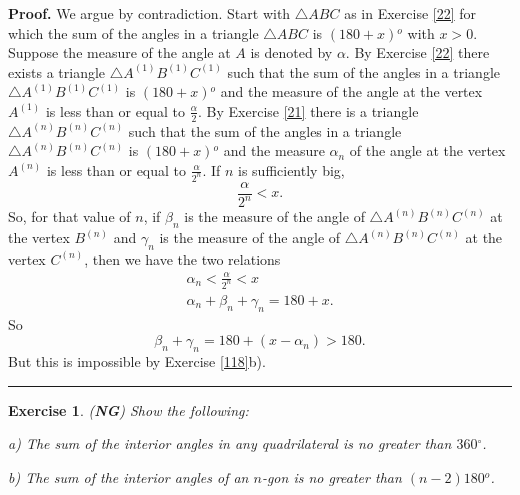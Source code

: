 \documentclass{article}%
\providecommand{\U}[1]{\protect\rule{.1in}{.1in}}
\newtheorem{exercise}[theorem]{Exercise}
\newenvironment{proof}[1][Proof]{\noindent\textbf{#1.} }{\ \rule{0.5em}{0.5em}}
\begin{document}
\begin{proof}
We argue by contradiction. Start with $\triangle ABC$ as in Exercise \ref{22}
for which the sum of the angles in a triangle $\triangle ABC$ is $\left(
180+x\right)
{{}^o}%
$ with $x>0$. Suppose the measure of the angle at $A$ is denoted by $\alpha$.
By Exercise \ref{22} there exists a triangle $\triangle A^{\left(  1\right)
}B^{\left(  1\right)  }C^{\left(  1\right)  }$ such that the sum of the angles
in a triangle $\triangle A^{\left(  1\right)  }B^{\left(  1\right)
}C^{\left(  1\right)  }$ is $\left(  180+x\right)
{{}^o}%
$ and the measure of the angle at the vertex $A^{\left(  1\right)  }$ is less
than or equal to $\frac{\alpha}{2}$. By Exercise \ref{21} there is a triangle
$\triangle A^{\left(  n\right)  }B^{\left(  n\right)  }C^{\left(  n\right)  }$
such that the sum of the angles in a triangle $\triangle A^{\left(  n\right)
}B^{\left(  n\right)  }C^{\left(  n\right)  }$ is $\left(  180+x\right)
{{}^o}%
$ and the measure $\alpha_{n}$ of the angle at the vertex $A^{\left(
n\right)  }$ is less than or equal to $\frac{\alpha}{2^{n}}$. If $n$ is
sufficiently big,%
\[
\frac{\alpha}{2^{n}}<x.
\]
So, for that value of $n$, if $\beta_{n}$ is the measure of the angle of
$\triangle A^{\left(  n\right)  }B^{\left(  n\right)  }C^{\left(  n\right)  }$
at the vertex $B^{\left(  n\right)  }$ and $\gamma_{n}$ is the measure of the
angle of $\triangle A^{\left(  n\right)  }B^{\left(  n\right)  }C^{\left(
n\right)  }$ at the vertex $C^{\left(  n\right)  }$, then we have the two
relations%
\begin{gather*}
\alpha_{n}<\frac{\alpha}{2^{n}}<x\\
\alpha_{n}+\beta_{n}+\gamma_{n}=180+x.
\end{gather*}
So%
\[
\beta_{n}+\gamma_{n}=180+\left(  x-\alpha_{n}\right)  >180.
\]
But this is impossible by Exercise \ref{118}b).
\end{proof}

\begin{exercise}
(\textbf{NG}) Show the following:

a) The sum of the interior angles in any quadrilateral is no greater than $360%
{{}^\circ}%
$.

b) The sum of the interior angles of an $n$-gon is no greater than $\left(
n-2\right)  $\textperiodcentered$180%
{{}^o}%
$. \pagebreak
\end{exercise}
\end{document}
